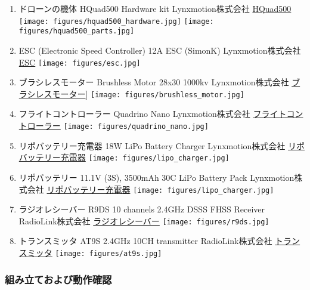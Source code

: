 \begin{enumerate}
\def\labelenumi{\arabic{enumi}.}
\item
  ドローンの機体 HQuad500 Hardware kit Lynxmotion株式会社
  \href{http://www.lynxmotion.com/p-1058-hquad500-hardware-only-kit.aspx}{HQuad500}
  \texttt{[image: figures/hquad500\_hardware.jpg]}
  \texttt{[image: figures/hquad500\_parts.jpg]}
\item
  ESC (Electronic Speed Controller) 12A ESC (SimonK) Lynxmotion株式会社
  \href{http://www.lynxmotion.com/p-915-12a-esc-simonk.aspx}{ESC}
  \texttt{[image: figures/esc.jpg]}
\item
  ブラシレスモーター Brushless Motor 28x30 1000kv Lynxmotion株式会社
  \href{http://www.lynxmotion.com/p-913-brushless-motor-28x30-1000kv.aspx}{ブラシレスモーター}{]}
  \texttt{[image: figures/brushless\_motor.jpg]}
\item
  フライトコントローラー Quadrino Nano Lynxmotion株式会社
  \href{http://www.lynxmotion.com/p-1020-lynxmotion-quadrino-nano-flight-controller-with-gps.aspx}{フライトコントローラー}
  \texttt{[image: figures/quadrino\_nano.jpg]}
\item
  リポバッテリー充電器 18W LiPo Battery Charger Lynxmotion株式会社
  \href{http://www.lynxmotion.com/p-985-18w-lipo-battery-charger.aspx}{リポバッテリー充電器}
  \texttt{[image: figures/lipo\_charger.jpg]}
\item
  リポバッテリー 11.1V (3S), 3500mAh 30C LiPo Battery Pack
  Lynxmotion株式会社
  \href{http://www.lynxmotion.com/p-985-18w-lipo-battery-charger.aspx}{リポバッテリー充電器}
  \texttt{[image: figures/lipo\_charger.jpg]}
\item
  ラジオレシーバー R9DS 10 channels 2.4GHz DSSS FHSS Receiver
  RadioLink株式会社
  \href{http://www.radiolink.com.cn/doce/product-detail-120.html}{ラジオレシーバー}
  \texttt{[image: figures/r9ds.jpg]}
\item
  トランスミッタ AT9S 2.4GHz 10CH transmitter RadioLink株式会社
  \href{http://www.radiolink.com.cn/doce/product-detail-119.html}{トランスミッタ}
  \texttt{[image: figures/at9s.jpg]}
\end{enumerate}

\hypertarget{ux7d44ux307fux7acbux3066ux304aux3088ux3073ux52d5ux4f5cux78baux8a8d}{%
\subsubsection{組み立ておよび動作確認}\label{ux7d44ux307fux7acbux3066ux304aux3088ux3073ux52d5ux4f5cux78baux8a8d}}


